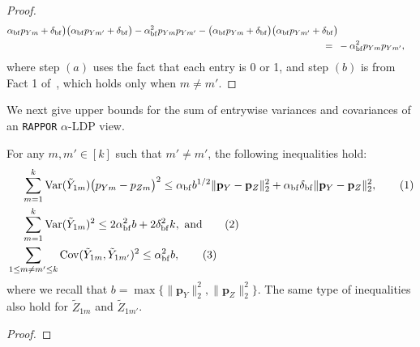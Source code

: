 \documentclass[twoside,11pt]{article}
\newcommand\numberthis{\addtocounter{equation}{1}\tag{\theequation}}
\newcommand{\rvTwo}{Y}
\newcommand{\rvThree}{Z}
\newcommand{\private}[1]{\tilde{#1}}
\newcommand{\normSqMultinomMax}{b}
\newcommand{\alphabetSize}{k} %
\newcommand{\vectorIndex}{m}
\newcommand{\probVecElement}[2]{p_{{#1}{#2}}}
\newcommand{\probVec}{\mathbf{p}} %
\newcommand{\privacyParameter}{\alpha} %
\newcommand{\privacyParameterrappor}{\privacyParameter_{\mathrm{bf}}}
\newcommand{\smallNumber}{\delta}
\newcommand{\smallNumberrappor}{\smallNumber_{\mathrm{bf}}}
\begin{document}
\begin{appendix}
\begin{proof}
\begin{align*}
			\privacyParameterrappor 
			\probVecElement{\rvTwo}{\vectorIndex}
			+ \smallNumberrappor
			\bigr) \bigl(
			\privacyParameterrappor 
			\probVecElement{\rvTwo}{\vectorIndex'}
			+ \smallNumberrappor	
			\bigr)
			-
			\privacyParameterrappor^2 \probVecElement{\rvTwo}{\vectorIndex} \probVecElement{\rvTwo}{\vectorIndex'}
			-
			\bigl(
			\privacyParameterrappor 
			\probVecElement{\rvTwo}{\vectorIndex}
			+ \smallNumberrappor
			\bigr) \bigl(
			\privacyParameterrappor 
			\probVecElement{\rvTwo}{\vectorIndex'}
			+ \smallNumberrappor	
			\bigr)
			\\ = \hskip 1.96mm &%
			-
			\privacyParameterrappor^2
			\probVecElement{\rvTwo}{\vectorIndex}
			\probVecElement{\rvTwo}{\vectorIndex'},
		\end{align*}
		where step $(a)$ uses the fact that each entry is 0 or 1, and step $(b)$ is from Fact 1 of~\citet{acharya_test_2019}, which holds only when $m \neq m'.$
	\end{proof}
	We next give upper bounds for the sum of  entrywise variances and covariances of an \texttt{RAPPOR} $\privacyParameter$-LDP view.
	\begin{lemma}\label{rappor:inequalities}
		For any $\vectorIndex, \vectorIndex' \in [\alphabetSize]$ such that $\vectorIndex' \neq \vectorIndex'$, the following inequalities hold:
		\begin{align*}
			& \quad \ \sum_{\vectorIndex=1}^\alphabetSize
			\mathrm{Var}
			( %
			\private{\rvTwo}_{1 \vectorIndex}
			) %
			\bigl( %
			\probVecElement{\rvTwo}{\vectorIndex}
			- %
			\probVecElement{\rvThree}{\vectorIndex}
			\bigr)^2
			\leq
			\privacyParameterrappor
			\normSqMultinomMax^{1/2}
			\|\probVec_{\rvTwo} - \probVec_{\rvThree}\|_2^2
			+
			\privacyParameterrappor
			\smallNumberrappor
			\|\probVec_{\rvTwo} - \probVec_{\rvThree}\|_2^2,
			\numberthis
			\label{inequality:var_diff_squared}
			\\& \quad \ 
			\sum_{\vectorIndex = 1}^\alphabetSize
			\mathrm{Var}(\private{Y}_{1 \vectorIndex})^2
			\leq
			2
			\privacyParameterrappor^2
			\normSqMultinomMax
			+
			2
			\smallNumberrappor^2
			\alphabetSize,~\text{and}
			\numberthis \label{inequality:var_squared}
			\\&
			\sum_{1 \leq \vectorIndex \neq \vectorIndex' \leq \alphabetSize}
			\mathrm{Cov}(\private{Y}_{1 \vectorIndex}, \private{Y}_{1 \vectorIndex'})^2
			\leq
			\privacyParameterrappor^2
			\normSqMultinomMax,
			\numberthis
			\label{inequality:cov_squared}
		\end{align*}
		where we recall  that
		$\normSqMultinomMax
		=
		\max \{
		\|\probVec_{\rvTwo}\|_2^2,
		\|\probVec_{\rvThree}\|_2^2\} 
		$.
		The same type of inequalities also hold for $\private{\rvThree}_{1 \vectorIndex}$ and $\private{\rvThree}_{1 \vectorIndex'}$.
	\end{lemma}
	\begin{proof}
		

\end{proof}
\end{appendix}
\end{document}
